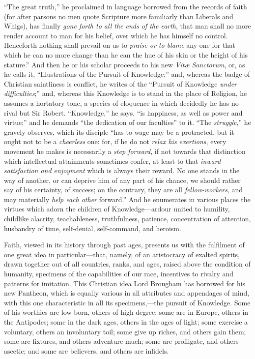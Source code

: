``The great truth,'' he proclaimed in language borrowed
from the records of faith (for after parsons no men quote Scripture
more familiarly than Liberals and Whigs), has finally \emph{gone forth to
all the ends of the earth}, that man shall no more render account
to man for his belief, over which he has himself no control.
Henceforth nothing shall prevail on us to \emph{praise or to blame}
any one for that which he can no more change than he can the hue of
his skin or the height of his stature.'' And then he or his
scholar proceeds to his new \emph{Vitæ Sanctorum}, or, as he calls
it, ``Illustrations of the Pursuit of Knowledge;'' and,
whereas the badge of Christian saintliness is conflict, he writes of
the ``Pursuit of Knowledge \emph{under difficulties};'' and,
whereas this Knowledge is to stand in the place of Religion, he
assumes a hortatory tone, a species of eloquence in which decidedly he
has no rival but Sir Robert. ``Knowledge,'' he says, ``is
happiness, as well as power and virtue;'' and he demands ``the
dedication of our faculties'' to it. ``The \emph{struggle},''
he gravely observes, which its disciple ``has to wage may be a
protracted, but it ought not to be a \emph{cheerless} one: for,
if he do not \emph{relax his exertions}, every movement he makes is
necessarily a \emph{step forward}, if not towards that distinction
which intellectual attainments sometimes confer, at least to that \emph{inward
satisfaction and enjoyment} which is always their reward. No one
stands in the way of another, or can deprive him of any part of his
chance, we should rather say of his certainty, of success; on the
contrary, they are all \emph{fellow-workers}, and may materially \emph{help
each other} forward.'' And he enumerates in various places the
virtues which adorn the children of Knowledge—ardour united to
humility, childlike alacrity, teachableness, truthfulness, patience,
concentration of attention, husbandry of time, self-denial,
self-command, and heroism.

Faith, viewed in its history through past ages, presents us with
the fulfilment of one great idea in particular—that, namely, of an
aristocracy of exalted spirits, drawn together out of all countries,
ranks, and ages, raised above the condition of humanity, specimens of
the capabilities of our race, incentives to rivalry and patterns for
imitation. This Christian idea Lord Brougham has borrowed for his new
Pantheon, which is equally various in all attributes and appendages of
mind, with this one characteristic in all its specimens,—the pursuit
of Knowledge. Some of his worthies are low born, others of high
degree; some are in Europe, others in the Antipodes; some in the dark
ages, others in the ages of light; some exercise a voluntary, others
an involuntary toil; some give up riches, and others gain them; some
are fixtures, and others adventure much; some are profligate, and
others ascetic; and some are believers, and others are infidels.


